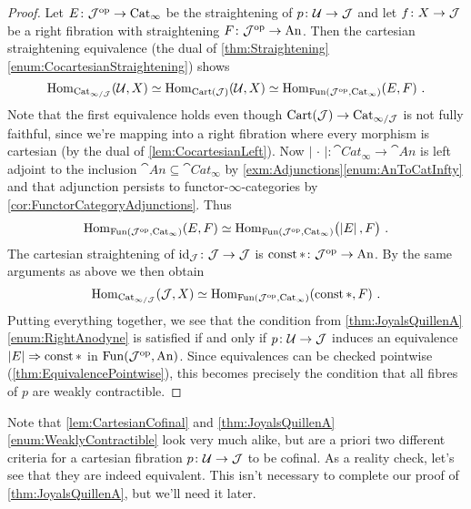 \begin{proof}
	Let $E\colon \mathcal{J}^{\mathrm{op}}\rightarrow\mathrm{Cat}_\infty$ be the straightening of $p\colon \mathcal{U}\rightarrow \mathcal{J}$ and let $f\colon X\rightarrow \mathcal{J}$ be a right fibration with straightening $F\colon \mathcal{J}^{\mathrm{op}}\rightarrow \mathrm{An}$. Then the cartesian straightening equivalence (the dual of \cref{thm:Straightening}\cref{enum:CocartesianStraightening}) shows
	\begin{equation*}
		\operatorname{Hom}_{\mathrm{Cat}_{\infty/\mathcal{J}}}\!\left(\mathcal{U},X\right)\simeq \operatorname{Hom}_{\mathrm{Cart}(\mathcal{J})}\!\left(\mathcal{U},X\right)\simeq \operatorname{Hom}_{\operatorname{Fun}(\mathcal{J}^{\mathrm{op}},\mathrm{Cat}_\infty)}\!\left(E,F\right)\,.
	\end{equation*}
	Note that the first equivalence holds even though $\mathrm{Cart}(\mathcal{J})\rightarrow\mathrm{Cat}_{\infty/\mathcal{J}}$ is not fully faithful, since we're mapping into a right fibration where every morphism is cartesian (by the dual of \cref{lem:CocartesianLeft}). Now $\left|\,\cdot\,\right|\colon \cat{Cat}_\infty\rightarrow \cat{An}$ is left adjoint to the inclusion $\cat{An}\subseteq \cat{Cat}_\infty$ by \cref{exm:Adjunctions}\cref{enum:AnToCatInfty} and that adjunction persists to functor-$\infty$-categories by \cref{cor:FunctorCategoryAdjunctions}. Thus
	\begin{equation*}
		\Hom_{\Fun(\Jj^\op,\cat{Cat}_\infty)}\!\left(E,F\right)\simeq \Hom_{\Fun(\Jj^\op,\cat{Cat}_\infty)}\lef(\left|E\right|,F\righ)\,.
	\end{equation*}
	The cartesian straightening of $\operatorname{id}_{\mathcal{J}}\colon \mathcal{J}\rightarrow \mathcal{J}$ is $\operatorname{const} *\colon \mathcal{J}^{\mathrm{op}}\rightarrow\mathrm{An}$. By the same arguments as above we then obtain
	\begin{equation*}
		\operatorname{Hom}_{\mathrm{Cat}_{\infty/\mathcal{J}}}\!\left(\mathcal{J},X\right)\simeq \operatorname{Hom}_{\operatorname{Fun}(\mathcal{J}^{\mathrm{op}},\mathrm{Cat}_\infty)}\!\left(\operatorname{const} *,F\right)\,.
	\end{equation*}
	Putting everything together, we see that the condition from \cref{thm:JoyalsQuillenA}\cref{enum:RightAnodyne} is satisfied if and only if $p\colon\mathcal{U}\rightarrow \mathcal{J}$ induces an equivalence $\left|E\right|\Rightarrow \operatorname{const} *$ in $\operatorname{Fun}(\mathcal{J}^{\mathrm{op}},\mathrm{An})$. Since equivalences can be checked pointwise (\cref{thm:EquivalencePointwise}), this becomes precisely the condition that all fibres of $p$ are weakly contractible.
\end{proof}
Note that \cref{lem:CartesianCofinal} and \cref{thm:JoyalsQuillenA}\cref{enum:WeaklyContractible} look very much alike, but are a priori two different criteria for a cartesian fibration $p\colon \mathcal{U}\rightarrow\mathcal{J}$ to be cofinal. As a reality check, let's see that they are indeed equivalent. This isn't necessary to complete our proof of \cref{thm:JoyalsQuillenA}, but we'll need it later.
